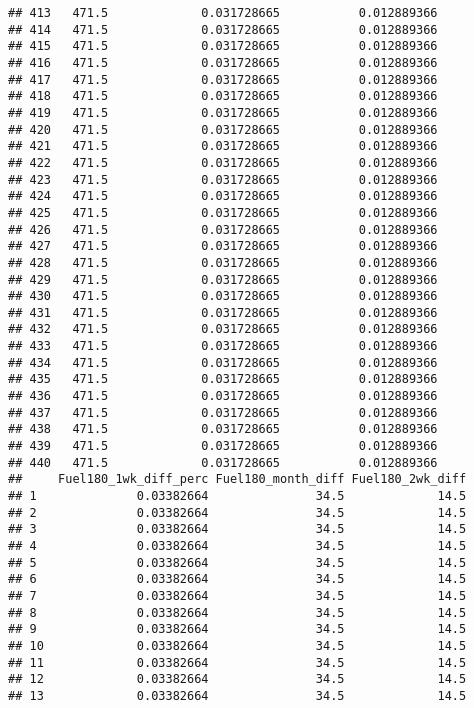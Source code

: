 \documentclass[]{article}
\begin{document}
\begin{verbatim}
## 413   471.5             0.031728665           0.012889366
## 414   471.5             0.031728665           0.012889366
## 415   471.5             0.031728665           0.012889366
## 416   471.5             0.031728665           0.012889366
## 417   471.5             0.031728665           0.012889366
## 418   471.5             0.031728665           0.012889366
## 419   471.5             0.031728665           0.012889366
## 420   471.5             0.031728665           0.012889366
## 421   471.5             0.031728665           0.012889366
## 422   471.5             0.031728665           0.012889366
## 423   471.5             0.031728665           0.012889366
## 424   471.5             0.031728665           0.012889366
## 425   471.5             0.031728665           0.012889366
## 426   471.5             0.031728665           0.012889366
## 427   471.5             0.031728665           0.012889366
## 428   471.5             0.031728665           0.012889366
## 429   471.5             0.031728665           0.012889366
## 430   471.5             0.031728665           0.012889366
## 431   471.5             0.031728665           0.012889366
## 432   471.5             0.031728665           0.012889366
## 433   471.5             0.031728665           0.012889366
## 434   471.5             0.031728665           0.012889366
## 435   471.5             0.031728665           0.012889366
## 436   471.5             0.031728665           0.012889366
## 437   471.5             0.031728665           0.012889366
## 438   471.5             0.031728665           0.012889366
## 439   471.5             0.031728665           0.012889366
## 440   471.5             0.031728665           0.012889366
##     Fuel180_1wk_diff_perc Fuel180_month_diff Fuel180_2wk_diff
## 1              0.03382664               34.5             14.5
## 2              0.03382664               34.5             14.5
## 3              0.03382664               34.5             14.5
## 4              0.03382664               34.5             14.5
## 5              0.03382664               34.5             14.5
## 6              0.03382664               34.5             14.5
## 7              0.03382664               34.5             14.5
## 8              0.03382664               34.5             14.5
## 9              0.03382664               34.5             14.5
## 10             0.03382664               34.5             14.5
## 11             0.03382664               34.5             14.5
## 12             0.03382664               34.5             14.5
## 13             0.03382664               34.5             14.5

\end{verbatim}
\end{document}
